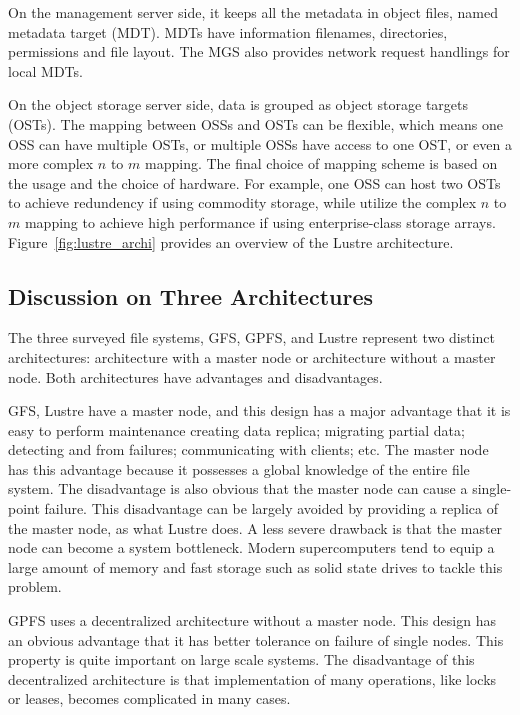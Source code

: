 On the management server side, it keeps all the metadata in object files,
named metadata target (MDT).
%
MDTs have information filenames, directories, permissions and file layout.
%
The MGS also provides network request handlings for local MDTs.

On the object storage server side, data is grouped as object storage targets
(OSTs). 
%
The mapping between OSSs and OSTs can be flexible, which means 
one OSS can have multiple OSTs, or
multiple OSSs have access to one OST, or
even a more complex $n$ to $m$ mapping.
%
The final choice of mapping scheme is based on the usage and the choice of 
hardware. 
%
For example, one OSS can host two OSTs to achieve redundency if using 
commodity storage, while utilize the complex $n$ to $m$ mapping to achieve
high performance if using enterprise-class storage arrays.
%
Figure~\ref{fig:lustre_archi} provides an overview of the Lustre architecture.


\subsection{Discussion on Three Architectures}
The three surveyed file systems, GFS, GPFS, and Lustre represent two 
distinct architectures: architecture with a master node or 
architecture without a master node.
%
Both architectures have advantages and disadvantages.

GFS, Lustre have a master node, and this design has a major advantage
that it is easy to perform maintenance creating data replica; 
migrating partial data; detecting and 
from failures; communicating with clients; etc.
%
The master node has this advantage because it possesses a global knowledge
of the entire file system.
%
The disadvantage is also obvious that the master node can cause a 
single-point failure.
%
This disadvantage can be largely avoided by providing a replica of the master
node, as what Lustre does.
%
A less severe drawback is that the master node can become a system bottleneck.
%
Modern supercomputers tend to equip a large amount of memory and fast storage
such as solid state drives to tackle this problem.

GPFS uses a decentralized architecture without a master node.
%
This design has an obvious advantage that it has better tolerance on 
failure of single nodes.
%
This property is quite important on large scale systems.
%
The disadvantage of this decentralized architecture is that implementation
of many operations, like locks or leases, becomes complicated in many cases.
%




